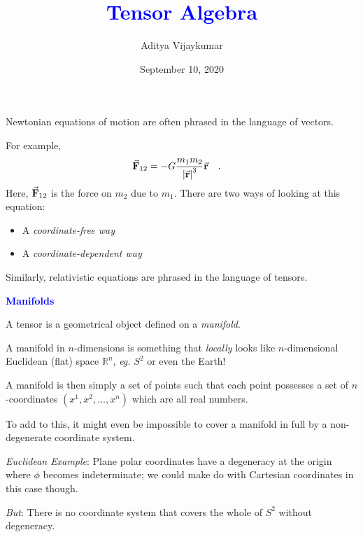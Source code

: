 \documentclass[landscape,aspectratio=169]{slides}
\title{\textcolor{blue}{\textbf{Tensor Algebra}}}
\date{September 10, 2020}
\author{Aditya Vijaykumar}
\begin{document}
	\maketitle
	\begin{slide}
	
	Newtonian equations of motion are often phrased in the language of vectors.
	
	For example, 	
	\begin{equation}\label{key}
	\va{F}_{12} = - G \dfrac{m_1 m_2}{\abs{\va{r}}^3} \va{r}  \qq{.}
	\end{equation}
	Here, $ \va{F}_{12} $ is the force on $ m_2 $ due to $ m_1 $. There are two ways of looking at this equation:
	\begin{itemize}
		\item A \textit{coordinate-free way}
		\item A \textit{coordinate-dependent way}
	\end{itemize}
	Similarly,  relativistic equations are phrased in the language of tensors.
\end{slide}
\begin{slide}
	\textcolor{blue}{\textbf{Manifolds}}
	
	A tensor is a geometrical object defined on a \textit{manifold}.
	
	A manifold in $ n $-dimensions is something that \textit{locally} looks like $ n $-dimensional Euclidean (flat) space $\mathbb{R}^n $, \textit{eg.} $ S^2 $ or even the Earth!
	
	A manifold is then simply a set of points such that each point possesses a set of $ n $-coordinates $ (x^1, x^2, \ldots, x^n) $ which are all real numbers.
\end{slide}	
\begin{slide}
	To add to this, it might even be impossible to cover a manifold in full by a non-degenerate coordinate system.
	
	\textit{Euclidean Example}: Plane polar coordinates have a degeneracy at the origin where $ \phi $ becomes indeterminate; we could make do with Cartesian coordinates in this case though.
	
	\textit{But}: There is no coordinate system that covers the whole of $ S^2 $ without degeneracy. 

\end{slide}
\end{document}
